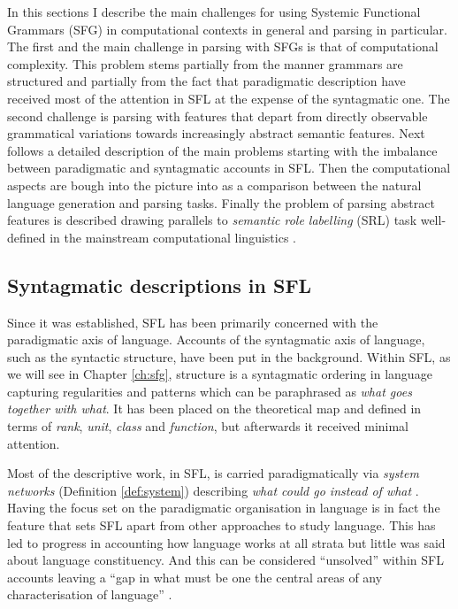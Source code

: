 In this sections I describe the main challenges for using Systemic Functional Grammars (SFG) in computational contexts in general and parsing in particular. The first and the main challenge in parsing with SFGs is that of computational complexity. This problem stems partially from the manner grammars are structured and partially from the fact that paradigmatic description have received most of the attention in SFL at the expense of the syntagmatic one. The second challenge is parsing with features that depart from directly observable grammatical variations towards increasingly abstract semantic features. 
Next follows a detailed description of the main problems starting with the imbalance between paradigmatic and syntagmatic accounts in SFL. Then the computational aspects are bough into the picture into as a comparison between the natural language generation and parsing tasks. Finally the problem of parsing abstract features is described drawing parallels to \textit{semantic role labelling} (SRL) task well-defined in the mainstream computational linguistics \citep{Carreras2005}. 

\subsection{Syntagmatic descriptions in SFL}

Since it was established, SFL has been primarily concerned with the paradigmatic axis of language. Accounts of the syntagmatic axis of language, such as the syntactic structure, have been put in the background. Within SFL, as we will see in Chapter \ref{ch:sfg}, structure is a syntagmatic ordering in language capturing regularities and patterns which can be paraphrased as \textit{what goes together with what}. It has been placed on the theoretical map and defined in terms of \textit{rank}, \textit{unit}, \textit{class} and \textit{function}, but afterwards it received minimal attention.

Most of the descriptive work, in SFL, is carried paradigmatically via \textit{system networks} (Definition \ref{def:system}) describing \textit{what could go instead of what} \citep[22]{Halliday2013}. Having the focus set on the paradigmatic organisation in language is in fact the feature that sets SFL apart from other approaches to study language.
This has led to progress in accounting how language works at all strata but little was said about language constituency. And this can be considered ``unsolved'' within SFL accounts leaving a ``gap in what must be one the central areas of any characterisation of language'' \citep[25]{Bateman2008}. 

